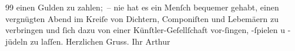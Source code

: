                   99 einen Gulden zu zahlen; – nie hat es ein Menſch bequemer gehabt,
               einen vergnügten Abend im {\pb}Kreiſe von Dichtern,
               Componiſten und Lebemä{\geminationn}ern zu verbringen und{ }ſich dazu
                von einer Künſtler-Geſellſchaft vor-ſingen, -ſpielen u -jüdeln zu laſſen.\pend
           \pstart Herzlichen Gruss. Ihr \spacefill\mbox{Arthur}\pend{}\endnumbering{}  \newcommand{\dateiname}{L00875}\newcommand{\titel}{Arthur Schnitzler an Richard Beer-Hofmann, 5. 1. 1899}\newcommand{\editorInnen}{Martin Anton Müller und Gerd-Hermann Susen}
